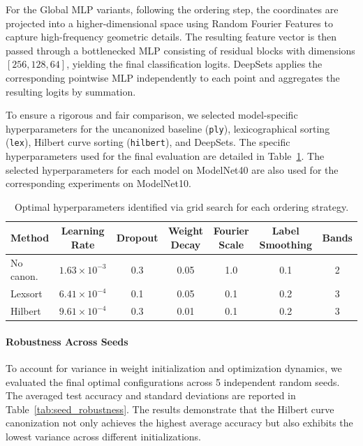 For the Global MLP variants, following the ordering step, the coordinates are projected into a higher-dimensional space using Random Fourier Features to capture high-frequency geometric details. The resulting feature vector is then passed through a bottlenecked MLP consisting of residual blocks with dimensions $[256,128,64]$, yielding the final classification logits. DeepSets applies the corresponding pointwise MLP independently to each point and aggregates the resulting logits by summation.

To ensure a rigorous and fair comparison, we selected model-specific hyperparameters for the uncanonized baseline (\texttt{ply}), lexicographical sorting (\texttt{lex}), Hilbert curve sorting (\texttt{hilbert}), and DeepSets. The specific hyperparameters used for the final evaluation are detailed in Table~\ref{tab:hyperparams}. The selected hyperparameters for each model on ModelNet40 are also used for the corresponding experiments on ModelNet10.
\begin{table}[h]
\centering
\caption{Optimal hyperparameters identified via grid search for each ordering strategy.}
\label{tab:hyperparams}
\begin{tabular}{lcccccc}
\toprule
\textbf{Method} & \textbf{Learning Rate} & \textbf{Dropout} & \textbf{Weight Decay} & \textbf{Fourier Scale} & \textbf{Label Smoothing} & \textbf{Bands} \\
\midrule
No canon. & $1.63 \times 10^{-3}$ & 0.3 & 0.05 & 1.0 & 0.1 & 2 \\
Lexsort  & $6.41 \times 10^{-4}$ & 0.1 & 0.05 & 0.1 & 0.2 & 3 \\
Hilbert  & $9.61 \times 10^{-4}$ & 0.3 & 0.01 & 0.1 & 0.2 & 3 \\
\bottomrule
\end{tabular}
\end{table}

\paragraph{Robustness Across Seeds}
To account for variance in weight initialization and optimization dynamics, we evaluated the final optimal configurations across 5 independent random seeds. The averaged test accuracy and standard deviations are reported in Table~\ref{tab:seed_robustness}. The results demonstrate that the Hilbert curve canonization not only achieves the highest average accuracy but also exhibits the lowest variance across different initializations.

